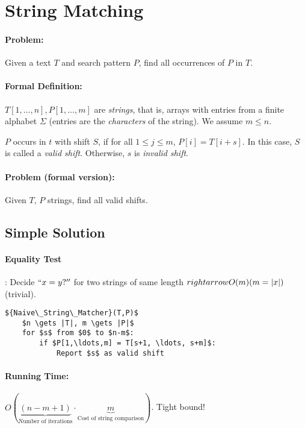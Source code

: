 \section{String Matching}

\paragraph{Problem:} Given a text $T$ and search pattern $P$, find all occurrences of $P$ in $T$.

\paragraph{Formal Definition:} $T[1, \ldots, n], P[1, \ldots, m]$ are \emph{strings}, that is, arrays with entries from a finite alphabet $\Sigma$ (entries are the \emph{characters} of the string). We assume $m \le n$.

$P$ occurs in $t$ with shift $S$, if for all $1\le j \le m$, $P[i] = T[i+s]$. In this case, $S$ is called a \emph{valid shift}. Otherwise, $s$ is \emph{invalid shift}.

\paragraph{Problem (formal version):} Given $T$, $P$ strings, find all valid shifts.

\subsection{Simple Solution}

\paragraph{Equality Test}: Decide $``x = y?''$ for two strings of same length $\\rightarrow O(m) (m = |x|)$ (trivial).

\begin{lstlisting}[mathescape]
	${Naive\_String\_Matcher}(T,P)$
	$n \gets |T|, m \gets |P|$
	for $s$ from $0$ to $n-m$:
		if $P[1,\ldots,m] = T[s+1, \ldots, s+m]$:
			Report $s$ as valid shift
\end{lstlisting}

\paragraph{Running Time:} $O(\underbrace{(n-m+1)}_\text{Number of iterations} \cdot \underbrace{m}_\text{Cost of string comparison})$. Tight bound!

